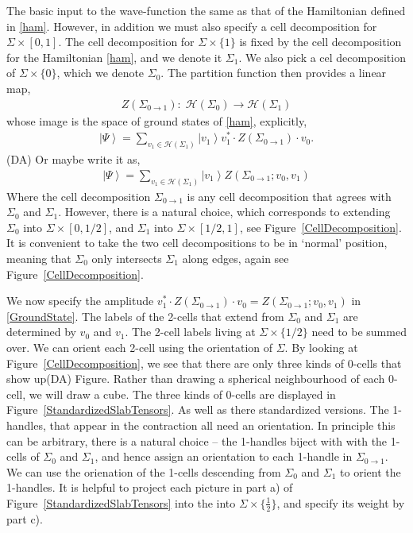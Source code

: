 \documentclass[12pt,a4paper]{article}
\newcounter{arrow}
\newcommand{\ra}{\rightarrow}
\newcommand{\mch}{\mathcal{H}}
\newcommand{\ket}[1]{\ensuremath{\left|#1\right\rangle}}
\newcommand{\dave}[1]{{\color{ao(english)}\footnotesize{(DA) #1}}}
\begin{document}
The basic input to the wave-function the same as that of the Hamiltonian defined in \eqref{ham}.
However, in addition we must also specify a cell decomposition for $\Sigma \times [0,1]$. 
The cell decomposition for $\Sigma \times \{ 1 \} $ is fixed by the cell decomposition for the Hamiltonian \eqref{ham}, and we denote it $\Sigma_1$.
We also pick a cel decomposition of $\Sigma \times \{0\}$, which we denote $\Sigma_0$.
The partition function then provides a linear map,
\begin{align}
Z(\Sigma_{0\ra1} ): \; \mch(\Sigma_0) \ra \mch(\Sigma_1)
\end{align}
whose image is the space of ground states of \eqref{ham}, 
explicitly, 
\begin{align}
\label{GroundState}
\ket{\Psi} = \sum_{ v_1 \in \mch(\Sigma_1)} \ket{v_1} v_1^* \cdot Z(\Sigma_{0\ra1} ) \cdot v_0.
\end{align} 
\dave{Or maybe write it as, 
\begin{align}
\ket{\Psi} = \sum_{v_1 \in \mch(\Sigma_1)} \ket{v_1} Z(\Sigma_{0\ra1}; v_0, v_1)
\end{align}
}
Where the cell decomposition $\Sigma_{0\ra1}$ is any cell decomposition that agrees with $\Sigma_0$ and $\Sigma_1$. 
However, there is a natural choice, which corresponds to extending $\Sigma_0$ into $\Sigma \times [0, 1/2]$, and $\Sigma_1$ into $\Sigma \times [1/2, 1]$, see Figure~\ref{CellDecomposition}. 
It is convenient to take the two cell decompositions to be in `normal' position,
meaning that $\Sigma_0$ only intersects $\Sigma_1$ along edges, again see Figure~\ref{CellDecomposition}.

We now specify the amplitude $v_1^* \cdot Z(\Sigma_{0\ra1}) \cdot v_0 = Z(\Sigma_{0\ra 1}; v_0, v_1) $ in \eqref{GroundState}.
The labels of the 2-cells that extend from $\Sigma_0$ and $\Sigma_1$ are determined by $v_0$ and $v_1$. 
The 2-cell labels living at $\Sigma \times \{ 1/2 \}$ need to be summed over.
We can orient each 2-cell using the orientation of $\Sigma$. 
By looking at Figure~\ref{CellDecomposition}, we see that there are only three kinds of 0-cells that show up\dave{Figure}. 
Rather than drawing a spherical neighbourhood of each 0-cell, 
we will draw a cube. 
The three kinds of 0-cells are displayed in Figure~\ref{StandardizedSlabTensors}.
As well as there standardized versions.
The 1-handles, that appear in the contraction all need an orientation.
In principle this can be arbitrary, there is a natural choice -- the 1-handles biject with with the 1-cells of $\Sigma_0$ and $\Sigma_1$, and hence assign an orientation to each 1-handle in $\Sigma_{0 \ra 1}$. 
We can use the orienation of the 1-cells descending from $\Sigma_0$ and $\Sigma_1$ to orient the 1-handles.
It is helpful to project each picture in part a) of Figure~\ref{StandardizedSlabTensors} into the into $\Sigma \times \{ \frac{1}{2} \} $, and specify its weight by part c). 
\end{document}
